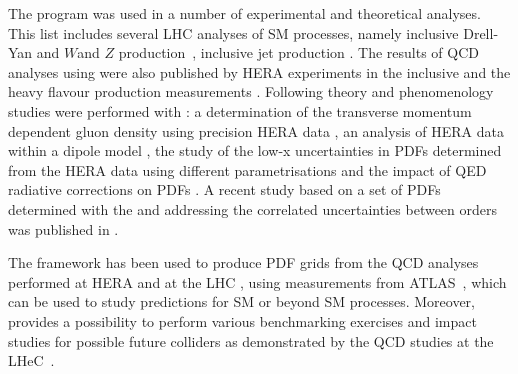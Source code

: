 The \fitter program was used in a number of experimental and theoretical analyses. 
This list includes several LHC analyses of SM processes, namely
inclusive Drell-Yan and $W$and $Z$ production~\cite{atlas:strange,cms:strange,atlas:hm,Aad:2014qja,Aad:2014xca},
inclusive jet production \cite{atlas:jets}.
The results of QCD analyses using \fitter were also
published by HERA experiments in the inclusive \cite{h1zeus:2009wt,h1:2012kk} and
the heavy flavour production measurements \cite{h1zeus:charm, Abramowicz:2014zub}.
Following theory and phenomenology studies were performed with \fitter:
a determination of the transverse momentum dependent gluon density using precision HERA data \cite{Hautmann:2013tba}, 
an analysis of HERA data within a dipole model \cite{Luszczak:2013rxa},
the study of the low-x uncertainties in PDFs determined from the HERA data using 
different parametrisations \cite{Chebyshev} and the impact of QED radiative corrections on PDFs \cite{Sadykov:2014aua}.
A recent study based on a set of PDFs determined with the \fitter and addressing 
the correlated uncertainties between orders was published in \cite{hfcorrpaper}. 
%

The \fitter framework has been used to produce PDF grids from the QCD analyses performed at 
HERA \cite{h1zeus:2009wt,hera:grids} and at the LHC \cite{atlas:grids}, using 
measurements from ATLAS~\cite{atlas:strange,atlas:jets}, which can be used to study predictions for SM 
or beyond SM processes. Moreover, \fitter provides a possibility to perform various benchmarking exercises
\cite{Butterworth:2014efa} and impact studies for possible future colliders
as demonstrated by the QCD studies at the LHeC~\cite{lhec:studies}.







